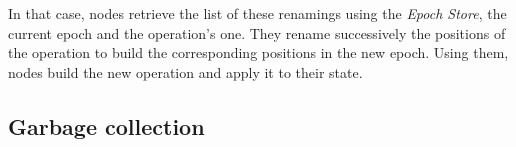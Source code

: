 \documentclass{article}
\theoremstyle{definition}
\begin{document}
In that case, nodes retrieve the list of these renamings using the \emph{Epoch Store}, the current epoch and the operation's one.
They rename successively the positions of the operation to build the corresponding positions in the new epoch.
Using them, nodes build the new operation and apply it to their state.



\subsection{Garbage collection}
\end{document}
